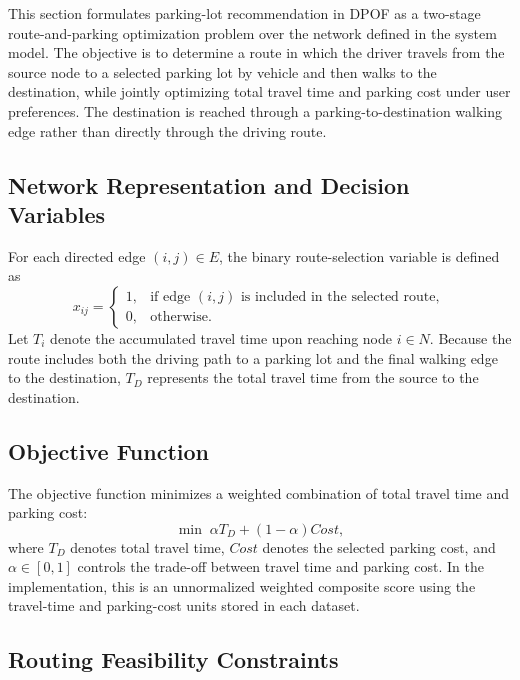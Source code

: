 This section formulates parking-lot recommendation in DPOF as a two-stage route-and-parking optimization problem over the network defined in the system model. The objective is to determine a route in which the driver travels from the source node to a selected parking lot by vehicle and then walks to the destination, while jointly optimizing total travel time and parking cost under user preferences. The destination is reached through a parking-to-destination walking edge rather than directly through the driving route.

\subsection{Network Representation and Decision Variables}

For each directed edge \((i,j)\in E\), the binary route-selection variable is defined as
\begin{equation}
x_{ij} =
\begin{cases}
1, & \text{if edge } (i,j) \text{ is included in the selected route},\\
0, & \text{otherwise}.
\end{cases}
\label{eq:x_definition}
\end{equation}
Let \(T_i\) denote the accumulated travel time upon reaching node \(i \in N\). Because the route includes both the driving path to a parking lot and the final walking edge to the destination, \(T_D\) represents the total travel time from the source to the destination.

\subsection{Objective Function}

The objective function minimizes a weighted combination of total travel time and parking cost:
\begin{equation}
\min \; \alpha T_D + (1-\alpha) Cost,
\label{eq:objective}
\end{equation}
where \(T_D\) denotes total travel time, \(Cost\) denotes the selected parking cost, and \(\alpha \in [0,1]\) controls the trade-off between travel time and parking cost. In the implementation, this is an unnormalized weighted composite score using the travel-time and parking-cost units stored in each dataset.

\subsection{Routing Feasibility Constraints}

